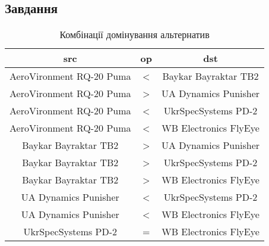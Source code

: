 \subsection{Завдання}
\label{subsec:sum/task}

\begin{table}[!ht]
    \caption{Комбінації домінування альтернатив}
    \label{tab:binary_pairs}
    \centering

    \begin{tabular}{|c|c|c|}
        \toprule
        src                      & op & dst                   \\

        \midrule
        AeroVironment RQ-20 Puma & <  & Baykar Bayraktar TB2  \\
        AeroVironment RQ-20 Puma & >  & UA Dynamics Punisher  \\
        AeroVironment RQ-20 Puma & <  & UkrSpecSystems PD-2   \\
        AeroVironment RQ-20 Puma & <  & WB Electronics FlyEye \\
        Baykar Bayraktar TB2     & >  & UA Dynamics Punisher  \\
        Baykar Bayraktar TB2     & >  & UkrSpecSystems PD-2   \\
        Baykar Bayraktar TB2     & >  & WB Electronics FlyEye \\
        UA Dynamics Punisher     & <  & UkrSpecSystems PD-2   \\
        UA Dynamics Punisher     & <  & WB Electronics FlyEye \\
        UkrSpecSystems PD-2      & =  & WB Electronics FlyEye \\

        \bottomrule
    \end{tabular}
\end{table}

